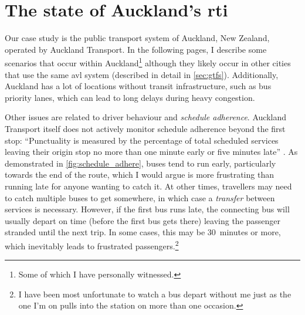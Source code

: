 \section{The state of Auckland's \gls{rti}}
\label{sec:auckland_etas}

Our case study is the public transport system of Auckland, New Zealand, operated by Auckland Transport. In the following pages, I describe some scenarios that occur within Auckland\footnote{Some of which I have personally witnessed.} although they likely occur in other cities that use the same \gls{avl} system (described in detail in \cref{sec:gtfs}). Additionally, Auckland has a lot of locations without transit infrastructure, such as bus priority lanes, which can lead to long delays during heavy congestion.


Other issues are related to driver behaviour and \emph{schedule adherence}. Auckland Transport itself does not actively monitor schedule adherence beyond the first stop: ``Punctuality is measured by the percentage of total scheduled services leaving their origin stop no more than one minute early or five minutes late'' \citep[13]{AT_report_2019}. As demonstrated in \cref{fig:schedule_adhere}, buses tend to run early, particularly towards the end of the route, which I would argue is more frustrating than running late for anyone wanting to catch it. At other times, travellers may need to catch multiple buses to get somewhere, in which case a \emph{transfer} between services is necessary. However, if the first bus runs late, the connecting bus will usually depart on time (before the first bus gets there) leaving the passenger stranded until the next trip. In some cases, this may be 30~minutes or more, which inevitably leads to frustrated passengers.\footnote{I have been most unfortunate to watch a bus depart without me just as the one I'm on pulls into the station on more than one occasion.}


